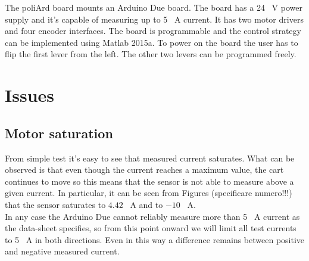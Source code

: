 The poliArd board mounts an Arduino Due board. The board has a 24 \SI{}{\volt} power supply and it’s capable of measuring up to 5 \SI{}{\ampere} current. It has two motor drivers and four encoder interfaces. The board is programmable and the control strategy can be implemented using Matlab 2015a. To power on the board the user has to flip the first lever from the left. The other two levers can be programmed freely.
\section{Issues}
\subsection{Motor saturation}
From simple test it’s easy to see that measured current saturates. What can be observed is that even though the current reaches a maximum value, the cart continues to move so this means that the sensor is not able to measure above a given current. In particular, it can be seen from Figures (specificare numero!!!) that the sensor saturates to $4.42$ \SI{}{\ampere} and to $-10$ \SI{}{\ampere}.\\
In any case the Arduino Due cannot reliably measure more than 5 \SI{}{\ampere} current as the data-sheet specifies, so from this point onward we will limit all test currents to 5 \SI{}{\ampere} in both directions. Even in this way a difference remains between positive and negative measured current.  
